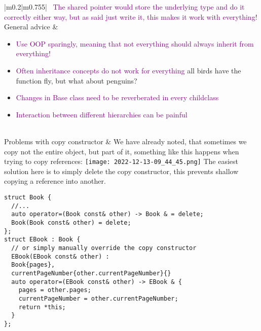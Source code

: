 \documentclass[main.tex,fontsize=8pt,paper=a4,paper=portrait,DIV=calc,]{scrartcl}
\begin{document}
\begin{table}[ht!]
\begin{tabular}{|m{0.2\linewidth}|m{0.755\linewidth}|}
\, \newline
\textcolor{purple}{The shared pointer would store the underlying type and do it correctly either way, but as said just write it, this makes it work with everything!}\\
\hline
General advice & 
\vspace{2mm}
\begin{itemize}
\item \textcolor{purple}{Use OOP sparingly, meaning that not everything should always inherit from everything!}
\item \textcolor{purple}{Often inheritance concepts do not work for everything}\newline
  all birds have the function fly, but what about penguins?
\item \textcolor{purple}{Changes in Base class need to be reverberated in every childclass}
\item \textcolor{purple}{Interaction between different hierarchies can be painful}
\vspace{-3mm}
\end{itemize} 
\\
\hline
Problems with copy constructor & 
We have already noted, that sometimes we copy not the entire object, but part of it, something like this happens when trying to copy references:\newline
\texttt{[image: 2022-12-13-09\_44\_45.png]}\newline
The easiest solution here is to simply delete the copy constructor, this prevents shallow copying a reference into another.\newline
\begin{lstlisting}
struct Book {
  //...
  auto operator=(Book const& other) -> Book & = delete;
  Book(Book const& other) = delete;
};
struct EBook : Book {
  // or simply manually override the copy constructor
  EBook(EBook const& other) :
  Book{pages},
  currentPageNumber{other.currentPageNumber}{}
  auto operator=(EBook const& other) -> EBook & {
    pages = other.pages;
    currentPageNumber = other.currentPageNumber;
    return *this;
  }
};
\end{lstlisting}
\\
\hline
\end{tabular}
\end{table}
\pagebreak
\end{document}

